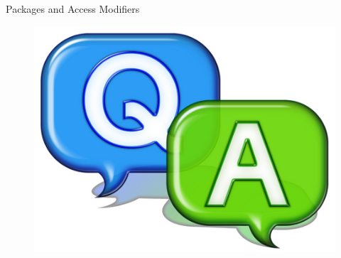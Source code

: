 \documentclass[14pt]{beamer}
\begin{document}
\begin{frame}{Packages and Access Modifiers}
 \begin{figure}[H]
 \begin{center}
   \includegraphics[scale=.3]{qa.png}   
 \end{center}
  \end{figure}
\end{frame}
\end{document}
